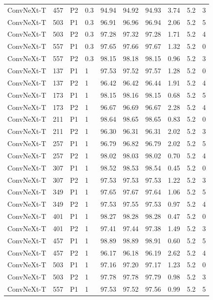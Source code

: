 {\begin{longtable}{lrllrrrrrr}
ConvNeXt-T & 457 & P2 & 0.3 & 94.94 & 94.92 & 94.93 & 3.74 & 5.2 & 3 \\
ConvNeXt-T & 503 & P1 & 0.3 & 96.91 & 96.96 & 96.94 & 2.06 & 5.2 & 5 \\
ConvNeXt-T & 503 & P2 & 0.3 & 97.28 & 97.32 & 97.28 & 1.71 & 5.2 & 4 \\
ConvNeXt-T & 557 & P1 & 0.3 & 97.65 & 97.66 & 97.67 & 1.32 & 5.2 & 0 \\
ConvNeXt-T & 557 & P2 & 0.3 & 98.15 & 98.18 & 98.15 & 0.96 & 5.2 & 3 \\
ConvNeXt-T & 137 & P1 & 1 & 97.53 & 97.52 & 97.57 & 1.28 & 5.2 & 0 \\
ConvNeXt-T & 137 & P2 & 1 & 96.42 & 96.42 & 96.44 & 1.91 & 5.2 & 4 \\
ConvNeXt-T & 173 & P1 & 1 & 98.15 & 98.16 & 98.15 & 0.68 & 5.2 & 5 \\
ConvNeXt-T & 173 & P2 & 1 & 96.67 & 96.69 & 96.67 & 2.28 & 5.2 & 4 \\
ConvNeXt-T & 211 & P1 & 1 & 98.64 & 98.65 & 98.65 & 0.83 & 5.2 & 0 \\
ConvNeXt-T & 211 & P2 & 1 & 96.30 & 96.31 & 96.31 & 2.02 & 5.2 & 3 \\
ConvNeXt-T & 257 & P1 & 1 & 96.79 & 96.82 & 96.79 & 2.02 & 5.2 & 5 \\
ConvNeXt-T & 257 & P2 & 1 & 98.02 & 98.03 & 98.02 & 0.70 & 5.2 & 4 \\
ConvNeXt-T & 307 & P1 & 1 & 98.52 & 98.53 & 98.54 & 0.45 & 5.2 & 0 \\
ConvNeXt-T & 307 & P2 & 1 & 97.53 & 97.53 & 97.53 & 1.22 & 5.2 & 3 \\
ConvNeXt-T & 349 & P1 & 1 & 97.65 & 97.67 & 97.64 & 1.06 & 5.2 & 5 \\
ConvNeXt-T & 349 & P2 & 1 & 97.53 & 97.55 & 97.53 & 0.97 & 5.2 & 4 \\
ConvNeXt-T & 401 & P1 & 1 & 98.27 & 98.28 & 98.28 & 0.47 & 5.2 & 0 \\
ConvNeXt-T & 401 & P2 & 1 & 97.41 & 97.44 & 97.38 & 1.49 & 5.2 & 3 \\
ConvNeXt-T & 457 & P1 & 1 & 98.89 & 98.89 & 98.91 & 0.60 & 5.2 & 5 \\
ConvNeXt-T & 457 & P2 & 1 & 96.17 & 96.18 & 96.19 & 2.62 & 5.2 & 4 \\
ConvNeXt-T & 503 & P1 & 1 & 97.16 & 97.20 & 97.17 & 1.23 & 5.2 & 0 \\
ConvNeXt-T & 503 & P2 & 1 & 97.78 & 97.78 & 97.79 & 0.98 & 5.2 & 3 \\
ConvNeXt-T & 557 & P1 & 1 & 97.53 & 97.52 & 97.56 & 0.99 & 5.2 & 5 \\

\end{longtable}}
